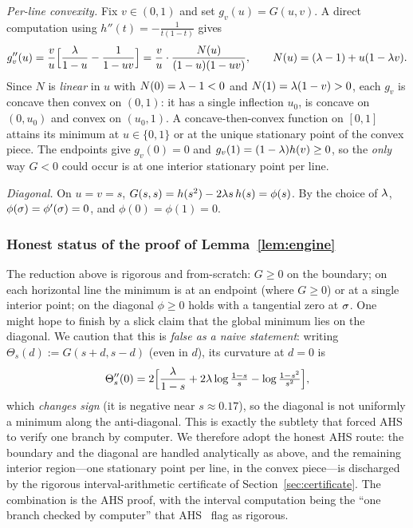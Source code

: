 \documentclass[11pt]{amsart}
\theoremstyle{definition}
\theoremstyle{remark}
\begin{document}
\emph{Per-line convexity.} Fix $v\in(0,1)$ and set $g_v(u)=G(u,v)$. A direct
computation using $h''(t)=-\tfrac1{t(1-t)}$ gives
\begin{equation}\label{eq:gvv}
   g_v''(u)=\frac{v}{u}\Bigl[\frac{\lambda}{1-u}-\frac{1}{1-uv}\Bigr]
   =\frac{v}{u}\cdot\frac{N(u)}{(1-u)(1-uv)},\qquad
   N(u)=(\lambda-1)+u(1-\lambda v).
\end{equation}
Since $N$ is \emph{linear} in $u$ with $N(0)=\lambda-1<0$ and $N(1)=\lambda(1-v)>0$,
each $g_v$ is concave then convex on $(0,1)$: it has a single inflection $u_0$, is
concave on $(0,u_0)$ and convex on $(u_0,1)$. A concave-then-convex function on
$[0,1]$ attains its minimum at $u\in\{0,1\}$ or at the unique stationary point of
the convex piece. The endpoints give $g_v(0)=0$ and $g_v(1)=(1-\lambda)h(v)\ge 0$, so
the \emph{only} way $G<0$ could occur is at one interior stationary point per
line.

\emph{Diagonal.} On $u=v=s$, $G(s,s)=h(s^2)-2\lambda s\,h(s)=\phi(s)$. By the choice
of $\lambda$, $\phi(\sigma)=\phi'(\sigma)=0$, and $\phi(0)=\phi(1)=0$.

\subsubsection*{Honest status of the proof of Lemma~\ref{lem:engine}}
The reduction above is rigorous and from-scratch: $G\ge 0$ on the boundary; on
each horizontal line the minimum is at an endpoint (where $G\ge 0$) or at a
single interior point; on the diagonal $\phi\ge 0$ holds with a tangential zero
at $\sigma$. One might hope to finish by a slick claim that the global minimum lies
on the diagonal. We caution that this is \emph{false as a naive statement}: writing
$\Theta_s(d):=G(s+d,s-d)$ (even in $d$), its curvature at $d=0$ is
\begin{equation}\label{eq:theta}
   \Theta_s''(0)=2\Bigl[\frac{\lambda}{1-s}+2\lambda\log\tfrac{1-s}{s}-\log\tfrac{1-s^2}{s^2}\Bigr],
\end{equation}
which \emph{changes sign} (it is negative near $s\approx 0.17$), so the diagonal
is not uniformly a minimum along the anti-diagonal. This is exactly the subtlety
that forced AHS to verify one branch by computer. We therefore adopt the honest
AHS route: the boundary and the diagonal are handled analytically as above, and
the remaining interior region---one stationary point per line, in the convex
piece---is discharged by the rigorous interval-arithmetic certificate of
Section~\ref{sec:certificate}. The combination is the AHS proof, with the
interval computation being the ``one branch checked by computer'' that
AHS~\cite{ahs2023} flag as rigorous.
\end{document}
